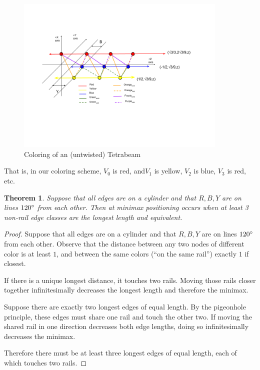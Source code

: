 \documentclass[11pt]{article}
\newtheorem{theorem}{Theorem}
\begin{document}
 \begin{figure}[H]
     \centering
     \includegraphics[width=0.9\textwidth]{figures/TetrahelixColoringDiagram.png}
     \caption{Coloring of an (untwisted) Tetrabeam}
 \end{figure}


  That is, in our coloring scheme, $V_0$ is red, and$ V_1$ is yellow,  $V_2$ is blue,
  $V_3$ is red, etc.

\begin{theorem}
  Suppose that all edges are on a cylinder and that $R,B,Y$ are on lines $120\degree$ from each other.
  Then at minimax positioning occurs when at least 3 non-rail edge classes are the longest length and equivalent.
 \end{theorem}
\begin{proof}
  Suppose that all edges are on a cylinder and that $R,B,Y$ are on lines $120\degree$ from each other. Observe
  that the distance between any two nodes of different color is at least $1$, and between the same colors (``on the same rail'') exactly $1$ if closest.

  If there is a unique longest distance, it touches two rails. Moving those rails closer together infinitesimally decreases the longest length and
  therefore the minimax.

  Suppose there are exactly two longest edges of equal length. By the pigeonhole principle, these edges must share one rail and touch the other two.
  If moving the shared rail in one direction decreases both edge lengths, doing so infinitesimally decreases the minimax.

  Therefore there must be at least three longest edges of equal length, each of which touches two rails.
  \end{proof}
\end{document}
